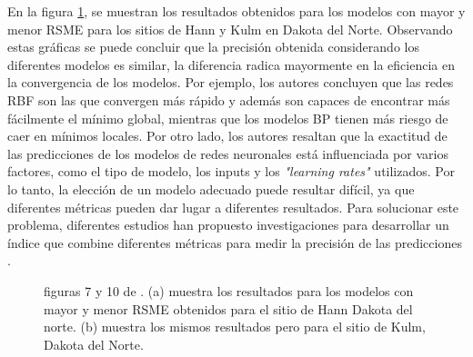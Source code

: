 \documentclass[12pt]{article}
\begin{document}
En la figura \ref{Li2_res},  se muestran los resultados obtenidos para los modelos con mayor y menor RSME para los sitios de Hann y Kulm en Dakota del Norte. Observando estas gráficas se puede concluir que la precisión obtenida considerando los diferentes modelos es similar, la diferencia radica mayormente en la eficiencia en la convergencia de los modelos. Por ejemplo, los autores concluyen que las redes RBF son las que convergen más rápido y además son capaces de encontrar más fácilmente el mínimo global, mientras que los modelos BP tienen más riesgo de caer en mínimos locales. Por otro lado, los autores resaltan que la exactitud de las predicciones de los modelos de redes neuronales está influenciada por varios factores, como el tipo de modelo, los inputs y los \textit{"learning rates"} utilizados. Por lo tanto, la elección de un modelo adecuado puede resultar difícil, ya que diferentes métricas pueden dar lugar a diferentes resultados. Para solucionar este problema, diferentes estudios han propuesto investigaciones para desarrollar un índice que combine diferentes métricas para medir la precisión de las predicciones \citep{Tseng,Daga}.

\begin{figure}
    \centering
    \caption{figuras 7 y 10 de \cite{Li2}. (a)  muestra los resultados para los modelos con mayor y menor RSME obtenidos para el sitio de Hann Dakota del norte. (b)  muestra los mismos resultados pero para el sitio de Kulm, Dakota del Norte.}
    \label{Li2_res}
\end{figure}
\end{document}
